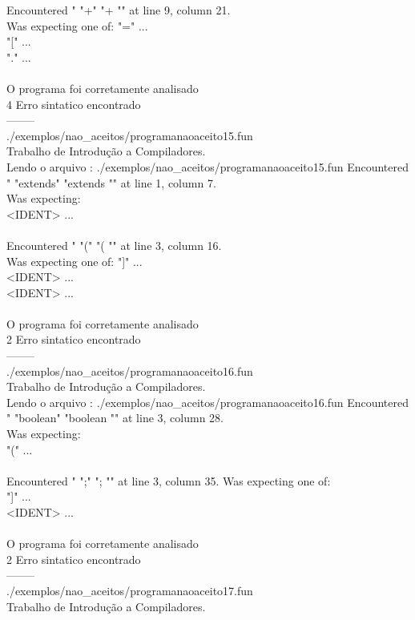\documentclass[
	article,			%
	11pt,				%
	oneside,			%
	a4paper,			%
	portuguese,			%
	brazil,				%
	sumario=tradicional
	]{abntex2}
\begin{document}
Encountered " "+" "+ "" at line 9, column 21.\\
Was expecting one of:
    "=" ...\\
    "[" ...\\
    "." ...\\
\\
O programa foi corretamente analisado\\
4 Erro sintatico encontrado\\
--------\\
./exemplos/nao\_aceitos/programanaoaceito15.fun\\
Trabalho de Introdução a Compiladores.\\
Lendo o arquivo : ./exemplos/nao\_aceitos/programanaoaceito15.fun
Encountered " "extends" "extends "" at line 1, column 7.\\
Was expecting:\\
    <IDENT> ...\\
\\
Encountered " "(" "( "" at line 3, column 16.\\
Was expecting one of:
    "]" ...\\
    <IDENT> ...\\
    <IDENT> ...\\
\\
O programa foi corretamente analisado\\
2 Erro sintatico encontrado\\
--------\\
./exemplos/nao\_aceitos/programanaoaceito16.fun\\
Trabalho de Introdução a Compiladores.\\
Lendo o arquivo : ./exemplos/nao\_aceitos/programanaoaceito16.fun
Encountered " "boolean" "boolean "" at line 3, column 28.\\
Was expecting:\\
    "(" ...\\
\\
Encountered " ";" "; "" at line 3, column 35.
Was expecting one of:\\
    "]" ...\\
    <IDENT> ...\\
\\
O programa foi corretamente analisado\\
2 Erro sintatico encontrado\\
--------\\
./exemplos/nao\_aceitos/programanaoaceito17.fun\\
Trabalho de Introdução a Compiladores.\\
\end{document}
